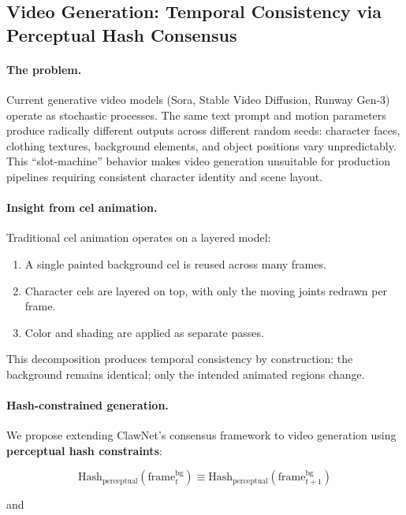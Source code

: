 \documentclass[11pt,a4paper]{article}
\begin{document}
\subsection{Video Generation: Temporal Consistency via Perceptual Hash
Consensus}
\label{sec:video}

\paragraph{The problem.}
Current generative video models (Sora, Stable Video Diffusion, Runway
Gen-3) operate as stochastic processes. The same text prompt and
motion parameters produce radically different outputs across different
random seeds: character faces, clothing textures, background elements,
and object positions vary unpredictably. This ``slot-machine'' behavior
makes video generation unsuitable for production pipelines requiring
consistent character identity and scene layout.

\paragraph{Insight from cel animation.}
Traditional cel animation operates on a layered model:
\begin{enumerate}
    \item A single painted background cel is reused across many frames.
    \item Character cels are layered on top, with only the moving joints
          redrawn per frame.
    \item Color and shading are applied as separate passes.
\end{enumerate}
This decomposition produces temporal consistency by construction:
the background remains identical; only the intended animated regions
change.

\paragraph{Hash-constrained generation.}
We propose extending ClawNet's consensus framework to video generation
using \textbf{perceptual hash constraints}:

\begin{equation}
    \text{Hash}_{\text{perceptual}}(\text{frame}_t^{\text{bg}}) \equiv
    \text{Hash}_{\text{perceptual}}(\text{frame}_{t+1}^{\text{bg}})
\end{equation}

\noindent and
\end{document}
